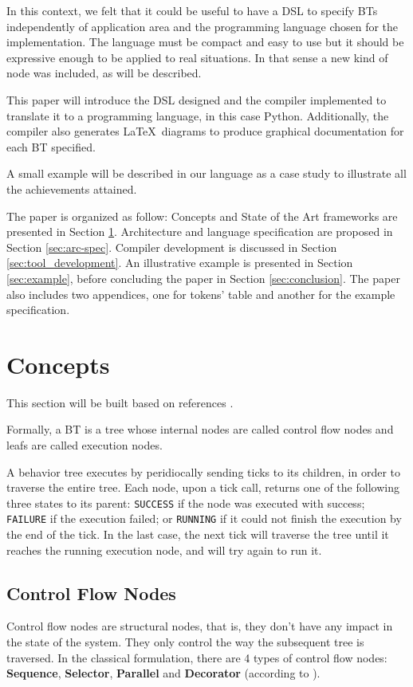 \documentclass[a4paper,UKenglish,cleveref, autoref, thm-restate]{oasics-v2019}
\begin{document}
In this context, we felt that it could be useful to have a DSL to specify BTs independently of application area and the programming language chosen for the implementation.
The language must be compact and easy to use but it should be expressive enough to be applied to real situations.
In that sense a new kind of node was included, as will be described.

This paper will introduce the DSL designed and the compiler implemented to translate it to a programming language, in this case Python.
Additionally, the compiler also generates \LaTeX\ diagrams to produce graphical documentation for each BT specified.

A small example will be described in our language as a case study to illustrate all the achievements attained.

The paper is organized as follow: Concepts and State of the Art frameworks are presented in Section \ref{sec:concepts}.
Architecture and language specification are proposed in Section \ref{sec:arc-spec}.
Compiler development is discussed in Section \ref{sec:tool_development}.
An illustrative example is presented in Section \ref{sec:example}, before concluding the paper in Section \ref{sec:conclusion}.
The paper also includes two appendices, one for tokens' table and another for the example specification.

\section{Concepts}
\label{sec:concepts}

This section will be built based on references \cite{ColOgr2018,Simpson2014,MilFunge2009}.

Formally, a BT is a tree whose internal nodes are called control flow nodes and leafs are called execution nodes.

A behavior tree executes by peridiocally sending ticks to its children, in order to traverse the entire tree.
Each node, upon a tick call, returns one of the following three states to its parent: \texttt{SUCCESS} if the node was executed with success; \texttt{FAILURE} if the execution failed; or \texttt{RUNNING} if it could not finish the execution by the end of the tick.
In the last case, the next tick will traverse the tree until it reaches the running execution node, and will try again to run it.

\subsection{Control Flow Nodes}
Control flow nodes are structural nodes, that is, they don't have any impact in the state of the system. They only control the way the subsequent tree is traversed.
In the classical formulation, there are 4 types of control flow nodes: \textbf{Sequence}, \textbf{Selector}, \textbf{Parallel} and \textbf{Decorator} (according to \cite{ColOgr2018}).
\end{document}
